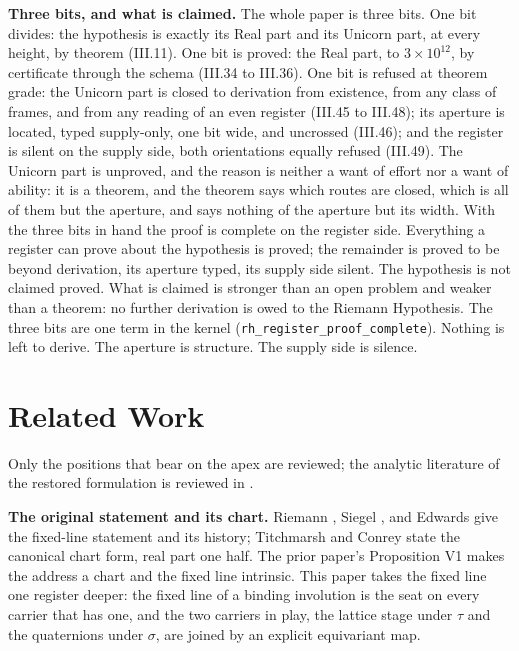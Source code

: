 \documentclass[10pt,twocolumn]{article}
\begin{document}
\textbf{Three bits, and what is claimed.} The whole paper is three bits.
One bit divides: the hypothesis is exactly its Real part and its Unicorn
part, at every height, by theorem (III.11). One bit is proved: the Real
part, to \(3 \times 10^{12}\), by certificate through the schema (III.34
to III.36). One bit is refused at theorem grade: the Unicorn part is
closed to derivation from existence, from any class of frames, and from
any reading of an even register (III.45 to III.48); its aperture is
located, typed supply-only, one bit wide, and uncrossed (III.46); and
the register is silent on the supply side, both orientations equally
refused (III.49). The Unicorn part is unproved, and the reason is
neither a want of effort nor a want of ability: it is a theorem, and the
theorem says which routes are closed, which is all of them but the
aperture, and says nothing of the aperture but its width. With the three
bits in hand the proof is complete on the register side. Everything a
register can prove about the hypothesis is proved; the remainder is
proved to be beyond derivation, its aperture typed, its supply side
silent. The hypothesis is not claimed proved. What is claimed is
stronger than an open problem and weaker than a theorem: no further
derivation is owed to the Riemann Hypothesis. The three bits are one
term in the kernel (\texttt{rh\_register\_proof\_complete}). Nothing is
left to derive. The aperture is structure. The supply side is silence.

\hypertarget{related-work}{%
\section{Related Work}\label{related-work}}

Only the positions that bear on the apex are reviewed; the analytic
literature of the restored formulation is reviewed in \cite{islamspine}.

\textbf{The original statement and its chart.} Riemann
\cite{riemann1859}, Siegel \cite{siegel1932}, and Edwards
\cite{edwards1974} give the fixed-line statement and its history;
Titchmarsh \cite{titchmarsh1986} and Conrey \cite{conrey2003} state the
canonical chart form, real part one half. The prior paper's Proposition
V1 makes the address a chart and the fixed line intrinsic. This paper
takes the fixed line one register deeper: the fixed line of a binding
involution is the seat on every carrier that has one, and the two
carriers in play, the lattice stage under \(\tau\) and the quaternions
under \(\sigma\), are joined by an explicit equivariant map.
\end{document}
